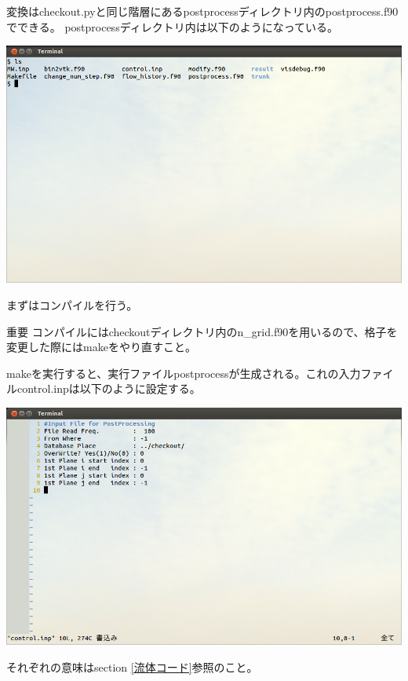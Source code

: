 \documentclass{jsarticle}
\begin{document}
変換はcheckout.pyと同じ階層にあるpostprocessディレクトリ内のpostprocess.f90でできる。
postprocessディレクトリ内は以下のようになっている。
\begin{center}
\includegraphics[width=.8\textwidth,bb=0 0 962 577]{tutorial_img/220.png}
\end{center}
まずはコンパイルを行う。
\begin{itembox}[l]{重要}
コンパイルにはcheckoutディレクトリ内のn\_grid.f90を用いるので、格子を変更した際にはmakeをやり直すこと。
\end{itembox}
makeを実行すると、実行ファイルpostprocessが生成される。これの入力ファイルcontrol.inpは以下のように設定する。
\begin{center}
\includegraphics[width=.8\textwidth,bb=0 0 962 577]{tutorial_img/230.png}
\end{center}
それぞれの意味はsection \ref{流体コード}参照のこと。
\end{document}

